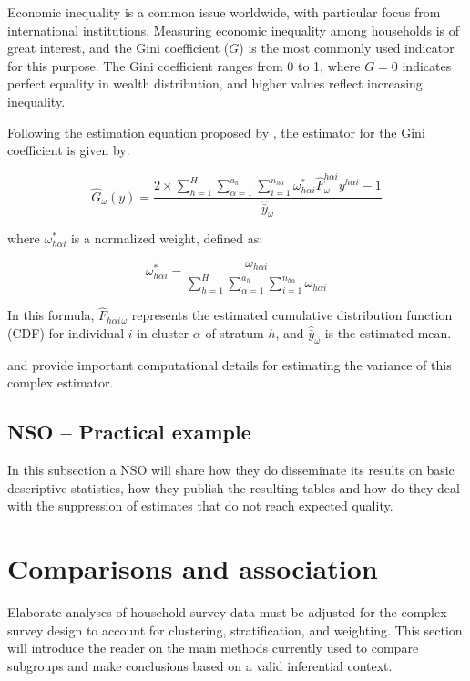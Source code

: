 \documentclass[
  12pt,
]{book}
\begin{document}
Economic inequality is a common issue worldwide, with particular focus from international institutions. Measuring economic inequality among households is of great interest, and the Gini coefficient (\(G\)) is the most commonly used indicator for this purpose. The Gini coefficient ranges from 0 to 1, where \(G = 0\) indicates perfect equality in wealth distribution, and higher values reflect increasing inequality.

Following the estimation equation proposed by \citet{binder1995estimating}, the estimator for the Gini coefficient is given by:

\[
\widehat{G}_{\omega}\left(y\right) = \frac{2 \times \sum_{h=1}^{H}\sum_{\alpha=1}^{a_{h}}\sum_{i=1}^{n_{h\alpha}}\omega_{h\alpha i}^{*}\hat{F}_{\omega}^{h\alpha i}y^{h\alpha i}-1}{\hat{\bar{y}}_{\omega}}
\]

where \(\omega_{h\alpha i}^{*}\) is a normalized weight, defined as:

\[
\omega_{h\alpha i}^{*} = \frac{\omega_{h\alpha i}}{\sum_{h=1}^{H}\sum_{\alpha=1}^{a_{h}}\sum_{i=1}^{n_{h\alpha}}\omega_{h\alpha i}}
\]

In this formula, \(\hat{F}_{h\alpha i}{}_{\omega}\) represents the estimated cumulative distribution function (CDF) for individual \(i\) in cluster \(\alpha\) of stratum \(h\), and \(\hat{\bar{y}}_{\omega}\) is the estimated mean.

\citet{osier2009variance} and \citet{Langel_Tille_2013} provide important computational details for estimating the variance of this complex estimator.

\hypertarget{nso-practical-example}{%
\section{NSO -- Practical example}\label{nso-practical-example}}

In this subsection a NSO will share how they do disseminate its results on basic descriptive statistics, how they publish the resulting tables and how do they deal with the suppression of estimates that do not reach expected quality.

\hypertarget{comparisons-and-association}{%
\chapter{Comparisons and association}\label{comparisons-and-association}}

Elaborate analyses of household survey data must be adjusted for the complex survey design to account for clustering, stratification, and weighting. This section will introduce the reader on the main methods currently used to compare subgroups and make conclusions based on a valid inferential context.
\end{document}
